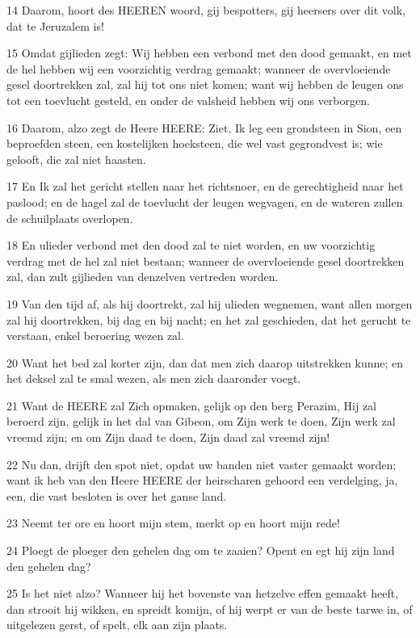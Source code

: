 \par 14 Daarom, hoort des HEEREN woord, gij bespotters, gij heersers over dit volk, dat te Jeruzalem is!
\par 15 Omdat gijlieden zegt: Wij hebben een verbond met den dood gemaakt, en met de hel hebben wij een voorzichtig verdrag gemaakt; wanneer de overvloeiende gesel doortrekken zal, zal hij tot ons niet komen; want wij hebben de leugen ons tot een toevlucht gesteld, en onder de valsheid hebben wij ons verborgen.
\par 16 Daarom, alzo zegt de Heere HEERE: Ziet, Ik leg een grondsteen in Sion, een beproefden steen, een kostelijken hoeksteen, die wel vast gegrondvest is; wie gelooft, die zal niet haasten.
\par 17 En Ik zal het gericht stellen naar het richtsnoer, en de gerechtigheid naar het paslood; en de hagel zal de toevlucht der leugen wegvagen, en de wateren zullen de schuilplaats overlopen.
\par 18 En ulieder verbond met den dood zal te niet worden, en uw voorzichtig verdrag met de hel zal niet bestaan; wanneer de overvloeiende gesel doortrekken zal, dan zult gijlieden van denzelven vertreden worden.
\par 19 Van den tijd af, als hij doortrekt, zal hij ulieden wegnemen, want allen morgen zal hij doortrekken, bij dag en bij nacht; en het zal geschieden, dat het gerucht te verstaan, enkel beroering wezen zal.
\par 20 Want het bed zal korter zijn, dan dat men zich daarop uitstrekken kunne; en het deksel zal te smal wezen, als men zich daaronder voegt.
\par 21 Want de HEERE zal Zich opmaken, gelijk op den berg Perazim, Hij zal beroerd zijn, gelijk in het dal van Gibeon, om Zijn werk te doen, Zijn werk zal vreemd zijn; en om Zijn daad te doen, Zijn daad zal vreemd zijn!
\par 22 Nu dan, drijft den spot niet, opdat uw banden niet vaster gemaakt worden; want ik heb van den Heere HEERE der heirscharen gehoord een verdelging, ja, een, die vast besloten is over het ganse land.
\par 23 Neemt ter ore en hoort mijn stem, merkt op en hoort mijn rede!
\par 24 Ploegt de ploeger den gehelen dag om te zaaien? Opent en egt hij zijn land den gehelen dag?
\par 25 Is het niet alzo? Wanneer hij het bovenste van hetzelve effen gemaakt heeft, dan strooit hij wikken, en spreidt komijn, of hij werpt er van de beste tarwe in, of uitgelezen gerst, of spelt, elk aan zijn plaats.
